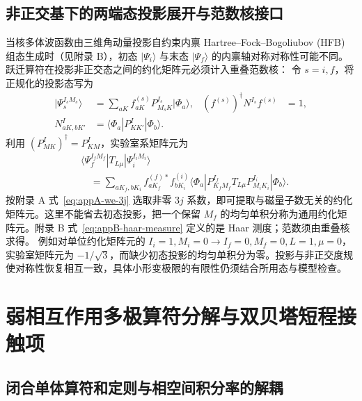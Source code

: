 \subsection{非正交基下的两端态投影展开与范数核接口}

当核多体波函数由三维角动量投影自约束内禀 Hartree--Fock--Bogoliubov (HFB) 组态生成时（见附录 B），初态 $|\Psi_i\rangle$ 与末态 $|\Psi_f\rangle$ 的内禀轴对称对称性可能不同。跃迁算符在投影非正交态之间的约化矩阵元必须计入重叠范数核：
令 $s=i,f$，将正规化的投影态写为
\begin{align}
 |\Psi_s^{I_sM_s}\rangle&=\sum_{aK}f^{(s)}_{aK}P^{I_s}_{M_sK}|\Phi_a\rangle,
 & (f^{(s)})^\dagger N^{I_s}f^{(s)}&=1,\\
 N^I_{aK,bK'}&=\langle\Phi_a|P^I_{KK'}|\Phi_b\rangle .
\end{align}
利用 $(P^I_{MK})^\dagger=P^I_{KM}$，实验室系矩阵元为
\begin{equation}\label{eq:appD-projected-nme}
\begin{aligned}
&\langle\Psi_f^{I_fM_f}|T_{L\mu}|\Psi_i^{I_iM_i}\rangle\\
&\quad=\sum_{aK_f,bK_i} f^{(f)*}_{aK_f}f^{(i)}_{bK_i}
 \langle\Phi_a|P^{I_f}_{K_fM_f}T_{L\mu}P^{I_i}_{M_iK_i}|\Phi_b\rangle .
\end{aligned}
\end{equation}
按附录 A 式~\eqref{eq:appA-we-3j} 选取非零 $3j$ 系数，即可提取与磁量子数无关的约化矩阵元。这里不能省去初态投影，把一个保留 $M_f$ 的均匀单积分称为通用约化矩阵元。附录 B 式~\eqref{eq:appB-haar-measure} 定义的是 Haar 测度；范数须由重叠核求得。
例如对单位约化矩阵元的 $I_i=1,M_i=0\to I_f=0,M_f=0,L=1,\mu=0$，实验室矩阵元为 $-1/\sqrt3$，而缺少初态投影的均匀单积分为零。投影与非正交度规使对称性恢复相互一致，具体小形变极限的有限性仍须结合所用态与模型检查。

\section{弱相互作用多极算符分解与双贝塔短程接触项}\label{sec:appD-weak-operators}

\subsection{闭合单体算符和定则与相空间积分率的解耦}

